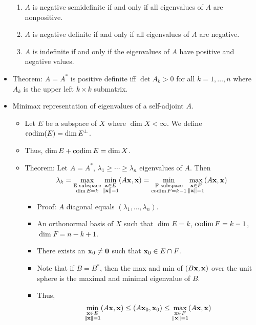 \documentclass[../../notes.tex]{subfiles}
\begin{document}
\begin{itemize}
\begin{enumerate}
        \item $A$ is negative semidefinite if and only if all eigenvalues of $A$ are nonpositive.
        \item $A$ is negative definite if and only if all eigenvalues of $A$ are negative.
        \item $A$ is indefinite if and only if the eigenvalues of $A$ have positive and negative values.
    \end{enumerate}
    \item Theorem: $A=A^*$ is positive definite iff $\det A_k>0$ for all $k=1,\dots,n$ where $A_k$ is the upper left $k\times k$ submatrix.
    \item Minimax representation of eigenvalues of a self-adjoint $A$.
    \begin{itemize}
        \item Let $E$ be a subspace of $X$ where $\dim X<\infty$. We define $\operatorname{codim}(E)=\dim E^\perp$.
        \item Thus, $\dim E+\operatorname{codim} E=\dim X$.
        \item Theorem: Let $A=A^*$, $\lambda_1\geq\cdots\geq\lambda_n$ eigenvalues of $A$. Then
        \begin{equation*}
            \lambda_k = \max_{\substack{\text{E subspace}\\\dim E=k}}\min_{\substack{\mathbf{x}\in E\\\norm{\mathbf{x}}=1}}(A\mathbf{x},\mathbf{x})
            = \min_{\substack{\text{F subspace}\\\operatorname{codim} F=k-1}}\max_{\substack{\mathbf{x}\in F\\\norm{\mathbf{x}}=1}}(A\mathbf{x},\mathbf{x})
        \end{equation*}
        \begin{itemize}
            \item Proof: $A$ diagonal equals $(\lambda_1,\dots,\lambda_n)$.
            \item An orthonormal basis of $X$ such that $\dim E=k$, $\operatorname{codim} F=k-1$, $\dim F=n-k+1$.
            \item There exists an $\mathbf{x}_0\neq\bm{0}$ such that $\mathbf{x}_0\in E\cap F$.
            \item Note that if $B=B^*$, then the max and min of $(B\mathbf{x},\mathbf{x})$ over the unit sphere is the maximal and minimal eigenvalue of $B$.
            \item Thus,
            \begin{equation*}
                \min_{\substack{\x\in E\\\norm{\x}=1}}(A\x,\x) \leq (A\x_0,\x_0)
                \leq \max_{\substack{\x\in F\\\norm{\x}=1}}(A\x,\x)

\end{equation*}
\end{itemize}
\end{itemize}
\end{itemize}
\end{document}
